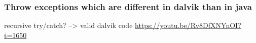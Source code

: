 \subsubsection{Throw exceptions which are different in dalvik than in java}
recursive try/catch? --> valid dalvik code\newline
\url{https://youtu.be/Rv8DfXNYnOI?t=1650}
